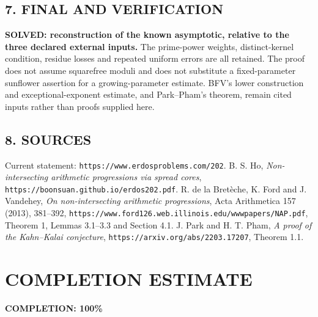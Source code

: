 \subsection*{7. FINAL AND VERIFICATION}
\textbf{SOLVED: reconstruction of the known asymptotic, relative to the three declared external inputs.}
The prime-power weights, distinct-kernel condition, residue losses and repeated uniform errors are all retained. The proof does not assume squarefree moduli and does not substitute a fixed-parameter sunflower assertion for a growing-parameter estimate. BFV's lower construction and exceptional-exponent estimate, and Park--Pham's theorem, remain cited inputs rather than proofs supplied here.
\subsection*{8. SOURCES}
Current statement: \texttt{https://www.erdosproblems.com/202}. B. S. Ho, \emph{Non-intersecting arithmetic progressions via spread cores}, \texttt{https://boonsuan.github.io/erdos202.pdf}. R. de la Bret\`eche, K. Ford and J. Vandehey, \emph{On non-intersecting arithmetic progressions}, Acta Arithmetica 157 (2013), 381--392, \texttt{https://www.ford126.web.illinois.edu/wwwpapers/NAP.pdf}, Theorem 1, Lemmas 3.1--3.3 and Section 4.1. J. Park and H. T. Pham, \emph{A proof of the Kahn--Kalai conjecture}, \texttt{https://arxiv.org/abs/2203.17207}, Theorem 1.1.
\section{COMPLETION ESTIMATE}
\textbf{COMPLETION: 100\%}
